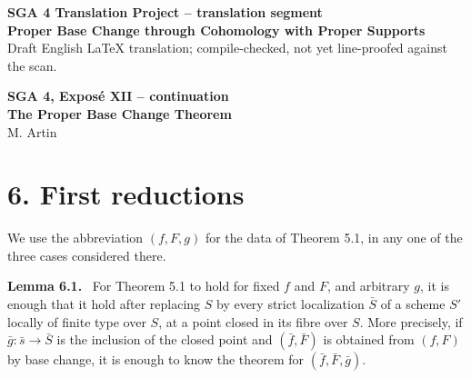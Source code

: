 \documentclass[12pt]{article}
\newenvironment{statement}[1]{\par\medskip\noindent\textbf{#1.}\ }{\par\medskip}
\begin{document}
\begin{center}
{\Large \textbf{SGA 4 Translation Project -- translation segment}}\\[0.4em]
{\large \textbf{Proper Base Change through Cohomology with Proper Supports}}\\[0.25em]
{\normalsize Draft English LaTeX translation; compile-checked, not yet line-proofed against the scan.}
\end{center}

\bigskip

\begin{center}
{\Large \textbf{SGA 4, Expos\'e XII -- continuation}}\\[0.35em]
{\large \textbf{The Proper Base Change Theorem}}\\[0.25em]
{\normalsize M. Artin}
\end{center}

\section*{6. First reductions}

We use the abbreviation \((f,F,g)\) for the data of Theorem 5.1, in any one of the three cases considered there.

\begin{statement}{Lemma 6.1}
For Theorem 5.1 to hold for fixed \(f\) and \(F\), and arbitrary \(g\), it is enough that it hold after replacing \(S\) by every strict localization \(\bar S\) of a scheme \(S'\) locally of finite type over \(S\), at a point closed in its fibre over \(S\). More precisely, if \(\bar g:\bar s\to \bar S\) is the inclusion of the closed point and \((\bar f,\bar F)\) is obtained from \((f,F)\) by base change, it is enough to know the theorem for \((\bar f,\bar F,\bar g)\).
\end{statement}
\end{document}
